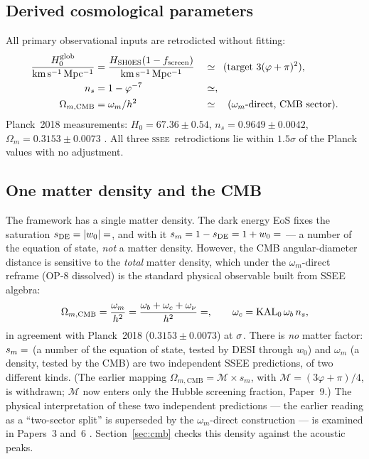 \documentclass[12pt,a4paper]{article}
\newcommand{\SSEE}{\textsc{ssee}}
\newcommand{\phiG}{\varphi}
\newcommand{\MIRA}{\mathcal{M}}
\newcommand{\Omm}{\Omega_{m}}
\newcommand{\sm}{s_m}
\newcommand{\OmmCMB}{\Omega_{m,\mathrm{CMB}}}
\newcommand{\wz}{w_0}
\begin{document}
\subsection{Derived cosmological parameters}
\label{sec:params}

All primary observational inputs are retrodicted without fitting:
\begin{alignat}{3}
  \frac{H_0^{\rm glob}}{\mathrm{km\,s^{-1}\,Mpc^{-1}}} &= \frac{H_{\rm SH0ES}(1-f_{\rm screen})}{\mathrm{km\,s^{-1}\,Mpc^{-1}}} &&\simeq \val{H0_GLOBAL_d5} \;\;(\text{target } 3(\phiG+\pi)^2),  \label{eq:H0}\\
  n_s   &= 1 - \phiG^{-7}        &&\simeq \val{N_S_d5},  \label{eq:ns}\\
  \OmmCMB &= \omega_m/h^2 &&\simeq \val{OMEGA_M_TOTAL_d6} \quad (\omega_m\text{-direct, CMB sector}).
  \label{eq:Omm}
\end{alignat}
Planck~2018 measurements: $H_0 = 67.36\pm 0.54$, $n_s = 0.9649\pm 0.0042$,
$\Omm = 0.3153\pm 0.0073$ \citep{Planck2018}.
All three \SSEE\ retrodictions lie within $1.5\sigma$ of the Planck values
with no adjustment.

\subsection{One matter density and the CMB}
\label{sec:mira}

The framework has a single matter density.
The dark energy EoS fixes the saturation $s_{\rm DE} = |{\wz}| = \val{S_DE_d6}$, and
with it $\sm = 1 - s_{\rm DE} = 1 + w_0 = \val{S_M_d6}$ --- a number of the
equation of state, \emph{not} a matter density.
However, the CMB angular-diameter distance is sensitive to the
\textit{total} matter density, which under the $\omega_m$-direct reframe
(OP-8 dissolved) is the standard physical observable built from SSEE algebra:
\begin{equation}
  \OmmCMB = \frac{\omega_m}{h^2}
          = \frac{\omega_b+\omega_c+\omega_\nu}{h^2} = \val{OMEGA_M_TOTAL_d6},
  \qquad \omega_c=\mathrm{KAL_0}\,\omega_b\,n_s,
  \label{eq:omega_m_direct}
\end{equation}
in agreement with Planck~2018 ($0.3153\pm 0.0073$) at $\val{om_planck_sig}\sigma$. There is
\emph{no} matter factor: $\sm=\val{S_M_d6}$ (a number of the equation of state,
tested by DESI through $w_0$) and $\omega_m$ (a density, tested by the CMB) are two
independent SSEE predictions, of two different kinds. (The earlier mapping $\OmmCMB=\MIRA\times\sm$, with $\MIRA=(3\phiG+\pi)/4$,
is withdrawn; $\MIRA$ now enters only the Hubble screening fraction, Paper~9.)
The physical interpretation of these two independent predictions --- the
earlier reading as a ``two-sector split'' is superseded by the
$\omega_m$-direct construction --- is examined in Papers~3 and~6 \citep{AlmeidaSSEE2026P3,AlmeidaSSEE2026P6}.
Section~\ref{sec:cmb} checks this density against the acoustic peaks.
\end{document}
